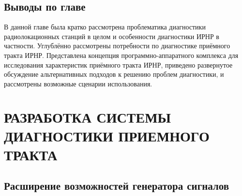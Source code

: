 \documentclass{report}
\begin{document}


\section*{Выводы по главе}

В данной главе была кратко рассмотрена проблематика диагностики радиолокационных станций в целом и особенности диагностики ИРНР в частности. Углублённо рассмотрены потребности по диагностике приёмного тракта ИРНР. Представлена концепция программно-аппаратного комплекса для исследования характеристик приёмного тракта ИРНР, приведено развернутое обсуждение альтернативных подходов к решению проблем диагностики, и рассмотрены возможные сценарии использования.

\chapter{РАЗРАБОТКА СИСТЕМЫ ДИАГНОСТИКИ ПРИЕМНОГО ТРАКТА}
\setcounter{section}{0}
\setcounter{subsection}{0}
\setcounter{equation}{0}
\section{Расширение возможностей генератора сигналов}
\end{document}
